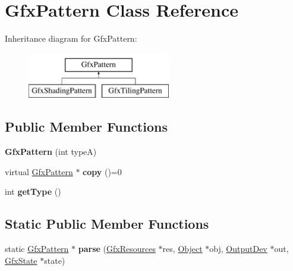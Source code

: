\hypertarget{class_gfx_pattern}{}\section{Gfx\+Pattern Class Reference}
\label{class_gfx_pattern}
Inheritance diagram for Gfx\+Pattern\+:\begin{figure}[H]
\begin{center}
\leavevmode
\includegraphics[height=2.000000cm]{class_gfx_pattern}
\end{center}
\end{figure}
\subsection*{Public Member Functions}
\begin{DoxyCompactItemize}
\item 
\mbox{\label{class_gfx_pattern_a8694673c1387b76905f73d0e7047a97c}} 
{\bfseries Gfx\+Pattern} (int typeA)
\item 
\mbox{\label{class_gfx_pattern_af0516fb6e3773fdc84572c89d7c49977}} 
virtual \hyperlink{class_gfx_pattern}{Gfx\+Pattern} $\ast$ {\bfseries copy} ()=0
\item 
\mbox{\label{class_gfx_pattern_aae6008f43ec86781622f49afdb496468}} 
int {\bfseries get\+Type} ()
\end{DoxyCompactItemize}
\subsection*{Static Public Member Functions}
\begin{DoxyCompactItemize}
\item 
\mbox{\label{class_gfx_pattern_a492ac313301dd62d0bae4f9bba034fe9}} 
static \hyperlink{class_gfx_pattern}{Gfx\+Pattern} $\ast$ {\bfseries parse} (\hyperlink{class_gfx_resources}{Gfx\+Resources} $\ast$res, \hyperlink{class_object}{Object} $\ast$obj, \hyperlink{class_output_dev}{Output\+Dev} $\ast$out, \hyperlink{class_gfx_state}{Gfx\+State} $\ast$state)
\end{DoxyCompactItemize}


